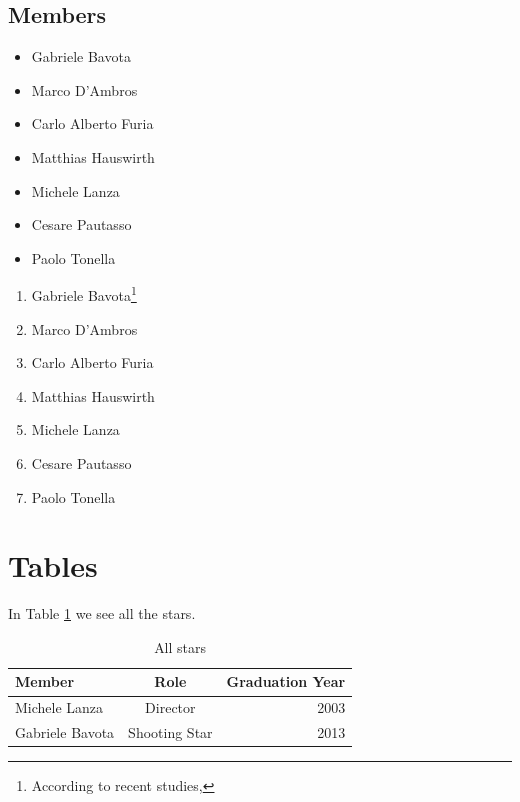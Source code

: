 \subsection{Members}

\begin{itemize}

\item Gabriele Bavota
\item Marco D'Ambros
\item Carlo Alberto Furia
\item Matthias Hauswirth
\item Michele Lanza
\item Cesare Pautasso
\item Paolo Tonella

\end{itemize}

\begin{enumerate}

\item Gabriele Bavota\footnote{According to recent studies, \lipsum[1]}
\item Marco D'Ambros
\item Carlo Alberto Furia
\item Matthias Hauswirth
\item Michele Lanza \cite{Lanz2006a}
\item Cesare Pautasso
\item Paolo Tonella

\end{enumerate}

\section{Tables}

In Table \ref{tab-allstars} we see all the stars.

\begin{table}[ht]
\centering
\begin{tabular}{lcr} \hline
{\bf Member} & {\bf Role} & {\bf Graduation Year}\\ \hline
Michele Lanza & Director & 2003\\
Gabriele Bavota & Shooting Star & 2013\\ \hline
\end{tabular}
\caption{All stars}
\label{tab-allstars}
\end{table}